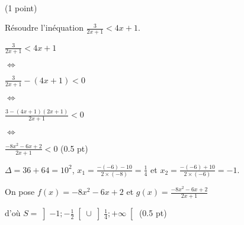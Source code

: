 \documentclass[a4paper,11pt]{article}
\theoremstyle{break}
\begin{document}
     ~
  \vspace{0.5cm}
  
  \begin{exo}(1 point)
   
  
  Résoudre l'inéquation $\frac{3}{2x+1} < 4x+1$.
  
\begin{correction}

 $\frac{3}{2x+1} < 4x+1$
 
 $\Leftrightarrow$
 
 $\frac{3}{2x+1} - (4x+1) <0$
 
 $\Leftrightarrow$
 
 $\frac{3-(4x+1)(2x+1)}{2x+1}<0$
 
 $\Leftrightarrow$
 
 $\frac{-8x^2-6x+2}{2x+1}<0$ (0.5 pt)
 
 $\Delta=36+64=10^2$, $x_1=\frac{-(-6)-10}{2\times (-8)}=\frac{1}{4}$ et $x_2=\frac{-(-6)+10}{2\times (-6)}=-1$. 
 
 On pose $f(x)=-8x^2-6x+2$ et $g(x)=\frac{-8x^2-6x+2}{2x+1}$
 

 
 d'o\`u $S=\left ]-1;-\frac{1}{2}\right [ \cup \left ]\frac{1}{4};+\infty \right [$ (0.5 pt)
\end{correction}
\end{exo}

 ~
  \vspace{0.5cm}
  
\end{document}
